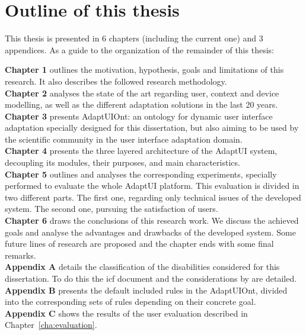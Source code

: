 
\section{Outline of this thesis}
\label{sec:outline}

This thesis is presented in 6 chapters (including the current one) and 3
appendices. As a guide to the organization of the remainder of this thesis:

\hspace*{5mm} \textbf{Chapter 1} outlines the motivation, hypothesis, goals and 
limitations of this research. It also describes the followed research 
methodology. \\

\hspace*{5mm} \textbf{Chapter 2} analyses the state of the art regarding user, 
context and device modelling, as well as the different adaptation solutions in 
the last 20 years. \\

\hspace*{5mm} \textbf{Chapter 3} presents AdaptUIOnt: an ontology for 
dynamic user interface adaptation specially designed for this dissertation, 
but also aiming to be used by the scientific community in the user interface 
adaptation domain.\\

\hspace*{5mm} \textbf{Chapter 4} presents the three layered architecture of 
the AdaptUI system, decoupling its modules, their purposes, and main 
characteristics.\\

\hspace*{5mm} \textbf{Chapter 5} outlines and analyses the corresponding
experiments, specially performed to evaluate the whole AdaptUI platform. This
evaluation is divided in two different parts. The first one, regarding only
technical issues of the developed system. The second one, pursuing the 
satisfaction of users.\\

\hspace*{5mm} \textbf{Chapter 6} draws the conclusions of this research work. We 
discuss the achieved goals and analyse the advantages and drawbacks of the 
developed system. Some future lines of research are proposed and the chapter 
ends with some final remarks.\\

\hspace*{5mm} \textbf{Appendix A} details the classification of the disabilities
considered for this dissertation. To do this the \ac{icf} document and the
considerations by \citet{persad_characterising_2007} are detailed.\\

\hspace*{5mm} \textbf{Appendix B} presents the default included rules in the
AdaptUIOnt, divided into the corresponding sets of rules depending on their concrete
goal.\\

\hspace*{5mm} \textbf{Appendix C} shows the results of the user evaluation
described in Chapter~\ref{cha:evaluation}.\\
